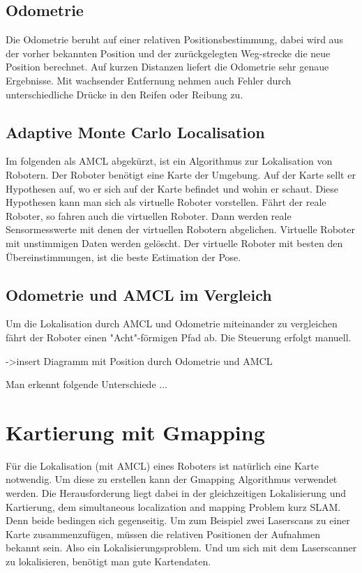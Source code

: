 \documentclass[11pt,a4paper]{article}
\begin{document}
\subsection{Odometrie}
{Die Odometrie beruht auf einer relativen Positionsbestimmung, dabei wird aus der vorher bekannten Position und der zur\"uckgelegten Weg-strecke die neue Position berechnet. Auf kurzen Distanzen liefert die Odometrie sehr genaue Ergebnisse. Mit wachsender Entfernung nehmen auch Fehler durch unterschiedliche Dr\"ucke in den Reifen oder Reibung zu.
	
	
	
	}
\subsection{Adaptive  Monte Carlo Localisation}
Im folgenden als AMCL abgek\"urzt, ist ein Algorithmus zur Lokalisation von Robotern. Der Roboter ben\"otigt eine Karte der Umgebung. Auf der Karte sellt er Hypothesen auf, wo er sich auf der Karte befindet und wohin er schaut. Diese Hypothesen kann man sich als virtuelle Roboter vorstellen. Fährt der reale Roboter, so fahren auch die virtuellen Roboter. Dann werden reale Sensormesswerte mit denen der virtuellen Robotern abgelichen. Virtuelle Roboter mit unstimmigen Daten werden gel\"oscht. Der virtuelle Roboter  mit besten den Übereinstimmungen, ist die beste Estimation der Pose. 


\subsection{Odometrie und AMCL im Vergleich}
Um die Lokalisation durch AMCL und Odometrie miteinander zu vergleichen f\"ahrt der Roboter einen "Acht"-f\"ormigen Pfad ab. Die Steuerung erfolgt manuell.  

->insert Diagramm mit Position durch Odometrie und AMCL 


Man erkennt folgende Unterschiede ...


\section{Kartierung mit Gmapping} \cite{gmapping}
F\"ur die Lokalisation (mit AMCL) eines Roboters ist nat\"urlich eine Karte notwendig. Um diese zu erstellen kann der Gmapping Algorithmus verwendet werden. Die Herausforderung liegt dabei in der gleichzeitigen Lokalisierung und Kartierung, dem simultaneous localization and mapping Problem	kurz SLAM. Denn beide bedingen sich gegenseitig. Um zum Beispiel zwei Laserscans zu einer Karte zusammenzuf\"ugen, m\"ussen die relativen Positionen der Aufnahmen bekannt sein. Also ein Lokalisierungsproblem. Und um sich mit dem Laserscanner zu lokalisieren, benötigt man gute Kartendaten. 
\end{document}
